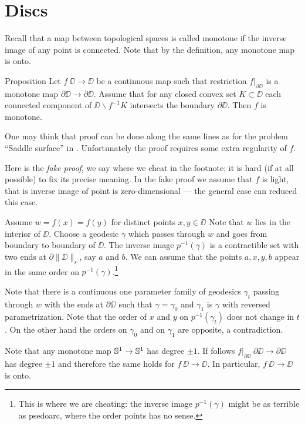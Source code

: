 \section{Discs}

Recall that a map between topological spaces is called monotone if the inverse image of any point is connected.
Note that by the definition, any monotone map is onto.

\begin{thm}{Proposition}\label{prop:mono-disc}
Let $f\:\DD\to \DD$ be a continuous map such that restriction $f|_{\partial\DD}$ is a monotone map $\partial\DD\to\partial\DD$.
Assume that for any closed convex set $K\subset \DD$ each connected component of $\DD\backslash f^{-1}K$ intersects the boundary $\partial \DD$.
Then $f$ is monotone.
\end{thm}

One may think that proof can be done along the same lines as for the problem ``Saddle surface'' in \cite{petrunin-orthodox}. 
Unfortunately the proof requires some extra regularity of $f$. 

Here is the \emph{fake proof}, we say where we cheat in the footnote; 
it is hard (if at all possible) to fix its precise meaning.
In the fake proof we assume that $f$ is light, that is inverse image of point is zero-dimensional --- the general case can reduced this case.

Assume  $w=f(x)=f(y)$ for distinct points $x,y\in\DD$
Note that  $w$ lies in the interior of $\DD$.
Choose a geodesic $\gamma$ which passes through $w$ and goes 
from boundary to boundary of $\DD$.
The inverse image $p^{-1}(\gamma)$ is a contractible set with two ends at $\partial\|\DD\|_s$, say $a$ and $b$.
We can assume that the points $a,x,y,b$ appear in the same order on $p^{-1}(\gamma)$.\footnote{This is where we are cheating: the inverse image $p^{-1}(\gamma)$ might be as terrible as psedoarc, where the order points has no sense.}

Note that there is a continuous one parameter family of geodesics $\gamma_t$ passing through $w$ with the ends at $\partial \DD$
such that $\gamma=\gamma_0$ and $\gamma_1$ is $\gamma$ with reversed parametrization.
Note that the order of $x$ and $y$ on $p^{-1}(\gamma_t)$ does not change in $t$.
On the other hand the orders on $\gamma_0$ and on $\gamma_1$ are opposite, a contradiction.\qeds 

Note that any monotone map $\mathbb{S}^1\to\mathbb{S}^1$ has degree $\pm1$.
If follows $f|_{\partial\DD}\:\partial\DD\to\partial\DD$ has degree $\pm1$
and therefore the same holds for $f\:\DD\to\DD$.
In particular, $f\:\DD\to\DD$ is onto.


